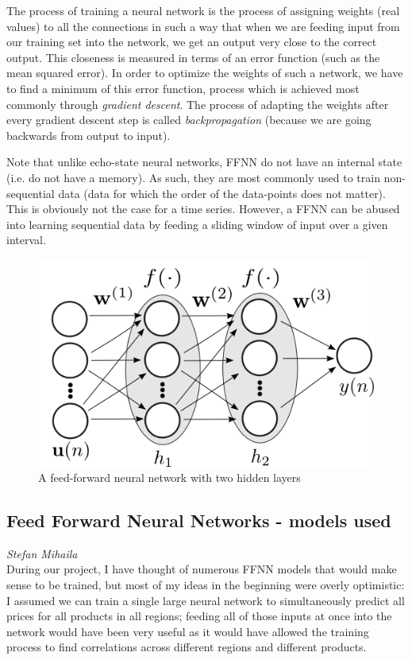 The process of training a neural network is the process of assigning weights
(real values) to all the connections in such a way that when we are feeding
input from our training set into the network, we get an output very close to
the correct output. This closeness is measured in terms of an error function
(such as the mean squared error). In order to optimize the weights of such a
network, we have to find a minimum of this error function, process which is
achieved most commonly through \emph{gradient descent}. The process of adapting
the weights after every gradient descent step is called \emph{backpropagation}
(because we are going backwards from output to input).

Note that unlike echo-state neural networks, FFNN do not have an internal state
(i.e. do not have a memory). As such, they are most commonly used to train
non-sequential data (data for which the order of the data-points does not matter).
This is obviously not the case for a time series.  However, a FFNN can be
abused into learning sequential data by feeding a sliding window of input over
a given interval.

\begin{figure}
    \centering
    \includegraphics[width=.7\textwidth]{img/ffnn_prezi.png}
    \caption{A feed-forward neural network with two hidden layers}
\end{figure}

\subsection*{Feed Forward Neural Networks - models used}
\emph{Stefan Mihaila}\\

During our project, I have thought of numerous FFNN models that would make
sense to be trained, but most of my ideas in the beginning were overly
optimistic: I assumed we can train a single large neural network to
simultaneously predict all prices for all products in all regions; feeding all
of those inputs at once into the network would have been very useful as it
would have allowed the training process to find correlations across different
regions and different products.

